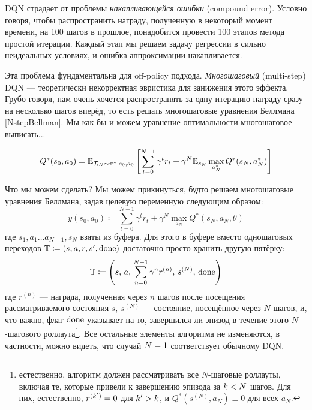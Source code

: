 DQN страдает от проблемы \emph{накапливающейся ошибки} (compound error). Условно говоря, чтобы распространить награду, полученную в некоторый момент времени, на 100 шагов в прошлое, понадобится провести 100 этапов метода простой итерации. Каждый этап мы решаем задачу регрессии в сильно неидеальных условиях, и ошибка аппроксимации накапливается.

Эта проблема фундаментальна для off-policy подхода. \emph{Многошаговый} (multi-step) DQN --- теоретически некорректная эвристика для занижения этого эффекта. Грубо говоря, нам очень хочется распространять за одну итерацию награду сразу на несколько шагов вперёд, то есть решать многошаговые уравнения Беллмана \eqref{NstepBellman}. Мы как бы и можем уравнение оптимальности многошаговое выписать...

\begin{proposition}
\begin{equation}\label{NstepOptimBellman}
 Q^*(s_0, a_0) = \mathbb{E}_{\mathcal{T}_{:N} \sim \pi^* \mid s_0, a_0} \left[ \sum_{t=0}^{N-1} \gamma^{t}r_t + \gamma^N \mathbb{E}_{s_N} \max_{a^*_N} Q^*(s_N, a^*_N) \right]   
\end{equation}
\end{proposition}

Что мы можем сделать? Мы можем прикинуться, будто решаем многошаговые уравнения Беллмана, задав целевую переменную следующим образом:
\begin{equation}\label{Nsteptarget}
y(s_0, a_0) \coloneqq \sum_{t=0}^{N-1} \gamma^{t}r_t + \gamma^N \max_{a_N} Q^*(s_N, a_N, \theta)
\end{equation}
где $s_1, a_1 \dots a_{N-1}, s_N$ взяты из буфера. Для этого в буфере вместо одношаговых переходов $\T \HM\coloneqq (s, a, r, s', \done)$ достаточно просто хранить другую пятёрку:
$$\mathbb{T} \coloneqq \left( s, \, a, \, \sum_{n=0}^{N-1} \gamma^{n}r^{(n)}, \, s^{(N)}, \, \mathrm{done} \right)$$
где $r^{(n)}$ --- награда, полученная через $n$ шагов после посещения рассматриваемого состояния $s$, $s^{(N)}$ --- состояние, посещённое через $N$ шагов, и, что важно, флаг $\mathrm{done}$ указывает на то, завершился ли эпизод в течение этого $N$-шагового роллаута\footnote{естественно, алгоритм должен рассматривать все $N$-шаговые роллауты, включая те, которые привели к завершению эпизода за $k \HM< N$ шагов. Для них, естественно, $r^{(k')} \HM= 0$ для $k' \HM> k$, и $Q^*(s^{(N)}, a_N) \equiv 0$ для всех $a_N$.}. Все остальные элементы алгоритма не изменяются, в частности, можно видеть, что случай $N \HM= 1$ соответствует обычному DQN.

